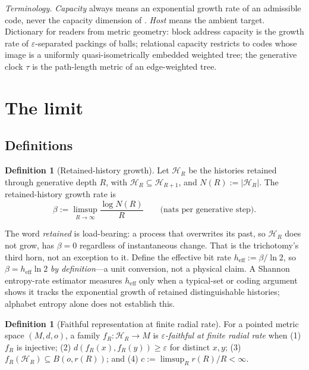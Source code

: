 \documentclass[11pt,reqno]{amsart}
\theoremstyle{plain}
\theoremstyle{definition}
\newtheorem{definition}[theorem]{Definition}
\newcommand{\heff}{h_{\mathrm{eff}}}
\newcommand{\eps}{\varepsilon}
\begin{document}
\emph{Terminology.} \emph{Capacity} always means an exponential growth rate of an admissible code, never the capacity dimension of \cite{buyaloschroeder2005}. \emph{Host} means the ambient target. Dictionary for readers from metric geometry: block address capacity is the growth rate of $\eps$-separated packings of balls; relational capacity restricts to codes whose image is a uniformly quasi-isometrically embedded weighted tree; the generative clock $\tau$ is the path-length metric of an edge-weighted tree.

\section{The limit}\label{sec:limit}

\subsection{Definitions}

\begin{definition}[Retained-history growth]
Let $\mathcal H_R$ be the histories retained through generative depth $R$, with $\mathcal H_R\subseteq\mathcal H_{R+1}$, and $N(R):=|\mathcal H_R|$. The retained-history growth rate is
\[
\beta:=\limsup_{R\to\infty}\frac{\log N(R)}{R}\qquad\text{(nats per generative step).}
\]
\end{definition}

The word \emph{retained} is load-bearing: a process that overwrites its past, so $\mathcal H_R$ does not grow, has $\beta=0$ regardless of instantaneous change. That is the trichotomy's third horn, not an exception to it. Define the effective bit rate $\heff:=\beta/\ln2$, so $\beta=\heff\ln2$ \emph{by definition}---a unit conversion, not a physical claim. A Shannon entropy-rate estimator measures $\heff$ only when a typical-set or coding argument shows it tracks the exponential growth of retained distinguishable histories; alphabet entropy alone does not establish this.

\begin{definition}[Faithful representation at finite radial rate]
For a pointed metric space $(M,d,o)$, a family $f_R:\mathcal H_R\to M$ is \emph{$\eps$-faithful at finite radial rate} when (1) $f_R$ is injective; (2) $d(f_R(x),f_R(y))\ge\eps$ for distinct $x,y$; (3) $f_R(\mathcal H_R)\subseteq B(o,r(R))$; and (4) $c:=\limsup_R r(R)/R<\infty$.
\end{definition}
\end{document}
